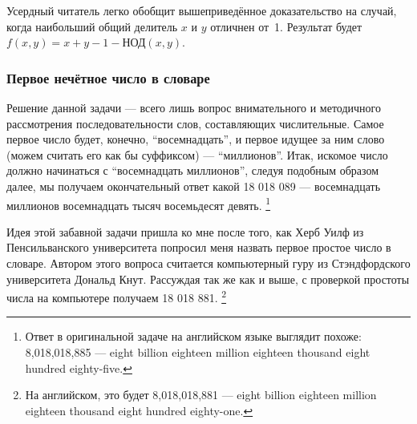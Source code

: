 Усердный читатель легко обобщит вышеприведённое доказательство на случай,  
когда наибольший общий делитель $x$ и $y$ отличнен от~1.  
Результат  будет $f(x,y)=x+y-1-\text{НОД}(x,y)$. 




\subsubsection*{Первое нечётное число в словаре}%


Решение данной задачи  ---  всего лишь вопрос внимательного и методичного рассмотрения последовательности слов, составляющих числительные. Самое первое число будет, конечно, “восемнадцать”, и первое идущее за ним слово (можем  считать его как бы суффиксом) --- “миллионов”. Итак, искомое число должно начинаться с
“восемнадцать миллионов”,  следуя подобным образом далее, мы получаем окончательный ответ какой 18 018 089 --- восемнадцать миллионов восемнадцать тысяч восемьдесят девять.%
\footnote{Ответ в оригинальной задаче на английском языке выглядит похоже: 8,018,018,885 --- eight billion eighteen million eighteen thousand eight hundred eighty-five.}
\heart

Идея этой забавной задачи пришла ко мне после того, как  Херб Уилф из Пенсильванского университета %
попросил меня назвать первое простое число в словаре. 
Автором этого вопроса считается компьютерный гуру из Стэндфордского университета Дональд Кнут. %
Рассуждая так же как и выше, с проверкой простоты числа на компьютере
получаем 18 018 881.%
\footnote{На английском, это будет 8,018,018,881 --- eight billion eighteen million eighteen thousand eight hundred eighty-one.}

